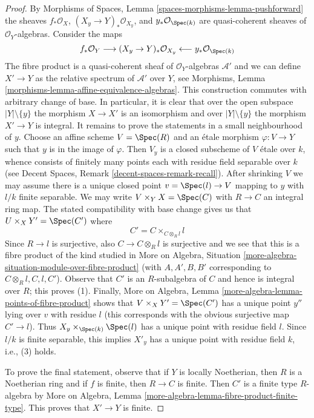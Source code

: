 \begin{proof}
By Morphisms of Spaces, Lemma \ref{spaces-morphisms-lemma-pushforward}
the sheaves $f_*\mathcal{O}_X$, $(X_y \to Y)_*\mathcal{O}_{X_y}$, and
$y_*\mathcal{O}_{\Spec(k)}$ are quasi-coherent sheaves of
$\mathcal{O}_Y$-algebras. Consider the maps
$$
f_*\mathcal{O}_Y \longrightarrow
(X_y \to Y)_*\mathcal{O}_{X_y} \longleftarrow
y_*\mathcal{O}_{\Spec(k)}
$$
The fibre product is a quasi-coherent sheaf of $\mathcal{O}_Y$-algebras
$\mathcal{A}'$ and we can define $X' \to Y$ as the relative spectrum
of $\mathcal{A}'$ over $Y$, see
Morphisms, Lemma \ref{morphisms-lemma-affine-equivalence-algebras}.
This construction commutes with arbitrary change of base.
In particular, it is clear that over the open subspace
$|Y| \setminus \{y\}$ the morphism $X \to X'$ is an isomorphism
and over $|Y| \setminus \{y\}$ the morphism $X' \to Y$ is integral.
It remains to prove the statements in a small neighbourhood of $y$.
Choose an affine scheme $V = \Spec(R)$ and an \'etale
morphism $\varphi : V \to Y$ such that $y$ is in the image of
$\varphi$. Then $V_y$ is a closed subscheme of $V$
\'etale over $k$, whence consists of finitely many points
each with residue field separable over $k$
(see Decent Spaces, Remark \ref{decent-spaces-remark-recall}).
After shrinking $V$
we may assume there is a unique closed point $v = \Spec(l) \to V$
mapping to $y$ with $l/k$ finite separable.
We may write $V \times_Y X = \Spec(C)$ with $R \to C$
an integral ring map. The stated compatibility with
base change gives us that $U \times_X Y' = \Spec(C')$ where
$$
C' = C \times_{C \otimes_R l} l
$$
Since $R \to l$ is surjective, also $C \to C \otimes_R l$
is surjective and we see that this is a fibre product of the
kind studied in More on Algebra, Situation
\ref{more-algebra-situation-module-over-fibre-product}
(with $A, A', B, B'$ corresponding to $C \otimes_R l, C, l, C'$).
Observe that $C'$ is an $R$-subalgebra of $C$ and hence
is integral over $R$; this proves (1).
Finally, More on Algebra, Lemma
\ref{more-algebra-lemma-points-of-fibre-product}
shows that $V \times_X Y' = \Spec(C')$
has a unique point $y''$ lying over $v$ with residue $l$
(this corresponds with the obvious surjective map $C' \to l$).
Thus $X_y \times_{\Spec(k)} \Spec(l)$ has a unique point
with residue field $l$. Since $l/k$ is finite separable,
this implies $X'_y$ has a unique point with residue field $k$, i.e.,
(3) holds.

\medskip\noindent
To prove the final statement, observe that if $Y$ is locally Noetherian,
then $R$ is a Noetherian ring and if $f$ is finite, then $R \to C$ is
finite. Then $C'$ is a finite type $R$-algebra by More on Algebra,
Lemma \ref{more-algebra-lemma-fibre-product-finite-type}.
This proves that $X' \to Y$ is finite.
\end{proof}

